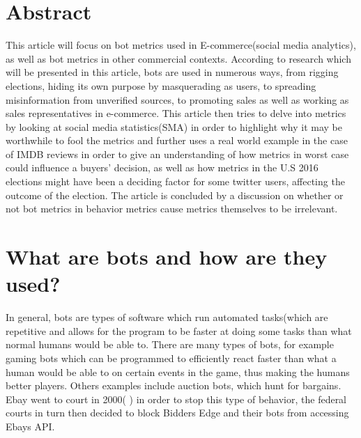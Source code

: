 \section*{Abstract}
This article will focus on bot metrics used in E-commerce(social media analytics), as well as bot metrics in other commercial contexts. According to research which will be presented in this article, bots are used in numerous ways, from rigging elections, hiding its own purpose by masquerading as users, to spreading misinformation from unverified sources, to promoting sales as well as working as sales representatives in e-commerce. This article then tries to delve into metrics by looking at social media statistics(SMA) in order to highlight why it may be worthwhile to fool the metrics and further uses a real world example in the case of IMDB reviews in order to give an understanding of how metrics in worst case could influence a buyers' decision, as well as how metrics in the U.S 2016 elections might have been a deciding factor for some twitter users, affecting the outcome of the election. The article is concluded by a discussion on whether or not bot metrics in behavior metrics cause metrics themselves to be irrelevant. 

\section{What are bots and how are they used?}\label{intro:howwhenwhy}
In general, bots are types of software which run automated tasks(which are repetitive and allows for the program to be faster at doing some tasks than what normal humans would be able to. There are many types of bots, for example gaming bots which can be programmed to efficiently react faster than what a human would be able to on certain events in the game, thus making the humans better players. Others examples include auction bots, which hunt for bargains. Ebay went to court in 2000( \cite{Computerworld:Ebay}) in order to stop this type of behavior, the federal courts in turn then decided to block Bidders Edge and their bots from accessing Ebays API.
\\

